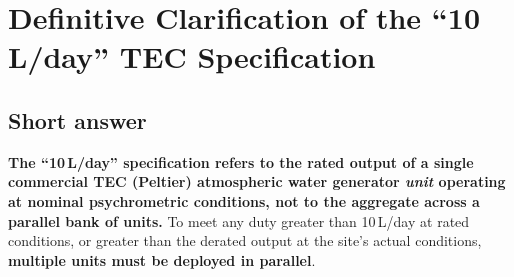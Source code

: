 \documentclass[11pt,a4paper]{article}
\begin{document}
\section{Definitive Clarification of the ``10\,L/day'' TEC Specification}
\label{sec:clarification}

\subsection{Short answer}
\textbf{The ``10\,L/day'' specification refers to the rated output of a single commercial TEC (Peltier) atmospheric water generator \emph{unit} operating at nominal psychrometric conditions, not to the aggregate across a parallel bank of units.} To meet any duty greater than 10\,L/day at rated conditions, or greater than the derated output at the site's actual conditions, \textbf{multiple units must be deployed in parallel}.
\end{document}
